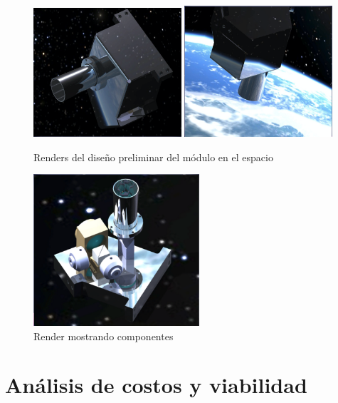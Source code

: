 \documentclass[11pt,titlepage]{article}
\begin{document}
\newpage
\begin{figure}[h!]
    \centering
    \includegraphics[width=0.49\textwidth]{fig/a.png}
    \includegraphics[width=0.49\textwidth]{fig/b.png}
    \caption{Renders del diseño preliminar del m\'odulo en el espacio}
    \label{fig:a}
\end{figure}
\begin{figure}[h!]
    \centering
    \includegraphics[width=0.55\textwidth]{fig/c.png}
    \caption{Render mostrando componentes}
    \label{fig:a}
\end{figure}
\newpage


\section{Análisis de costos y viabilidad}
\end{document}
